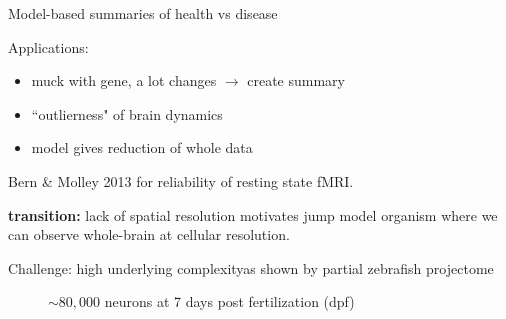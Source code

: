 \begin{frame}{Model-based summaries of health vs disease}
{		Applications:
		\begin{itemize}
				\item muck with gene, a lot changes $\rightarrow$ create summary
				\item ``outlierness" of brain dynamics
				\item model gives reduction of whole data
		\end{itemize}

		Bern \& Molley  2013 for reliability of resting state fMRI.

		\textbf{transition:} lack of spatial resolution motivates jump model organism where we can observe whole-brain at cellular resolution.
	}
\end{frame}{}


\begin{frame}{Challenge: high underlying complexity}{as shown by partial zebrafish projectome}
				\centering
				\begin{figure}
					\caption{$\sim80,000$ neurons at 7 days post fertilization (dpf)}
				\end{figure}

\end{frame}{}

